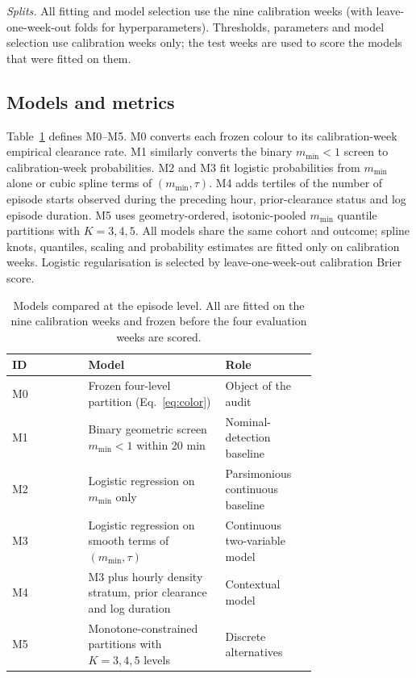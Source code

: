 \documentclass[aerospace,article,submit,moreauthors]{Definitions/mdpi}
\newcommand{\mmin}{m_{\min}}
\begin{document}
\emph{Splits.} All fitting and model selection use the nine calibration weeks (with leave-one-week-out folds for hyperparameters). Thresholds, parameters and model selection use calibration weeks only; the test weeks are used to score the models that were fitted on them.

\subsection{Models and metrics}
Table~\ref{tab:models} defines M0--M5. M0 converts each frozen colour to its calibration-week empirical clearance rate. M1 similarly converts the binary $\mmin<1$ screen to calibration-week probabilities. M2 and M3 fit logistic probabilities from $\mmin$ alone or cubic spline terms of $(\mmin,\tau)$. M4 adds tertiles of the number of episode starts observed during the preceding hour, prior-clearance status and log episode duration. M5 uses geometry-ordered, isotonic-pooled $\mmin$ quantile partitions with $K=3,4,5$. All models share the same cohort and outcome; spline knots, quantiles, scaling and probability estimates are fitted only on calibration weeks. Logistic regularisation is selected by leave-one-week-out calibration Brier score.

\begin{table}[t]
\caption{Models compared at the episode level. All are fitted on the nine calibration weeks and frozen before the four evaluation weeks are scored.}\label{tab:models}
\begin{tabular}{@{}lp{0.45\linewidth}p{0.30\linewidth}@{}}
\toprule
ID & Model & Role\\
\midrule
M0 & Frozen four-level partition (Eq.~\eqref{eq:color}) & Object of the audit\\
M1 & Binary geometric screen $\mmin<1$ within 20 min & Nominal-detection baseline\\
M2 & Logistic regression on $\mmin$ only & Parsimonious continuous baseline\\
M3 & Logistic regression on smooth terms of $(\mmin,\tau)$ & Continuous two-variable model\\
M4 & M3 plus hourly density stratum, prior clearance and log duration & Contextual model\\
M5 & Monotone-constrained partitions with $K=3,4,5$ levels & Discrete alternatives\\
\bottomrule
\end{tabular}
\end{table}
\end{document}
